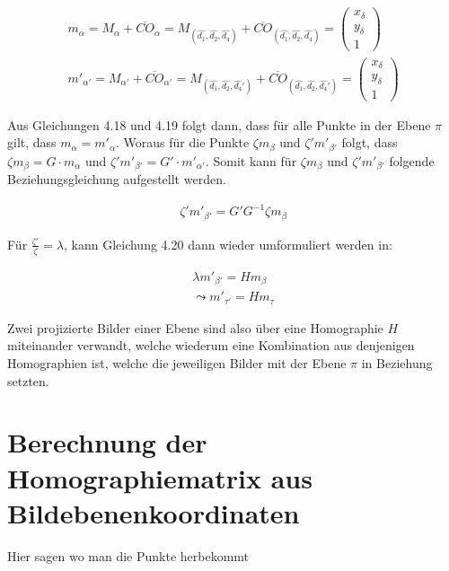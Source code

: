 \begin{gather}
	m_\alpha = M_\alpha + \overline{CO}_\alpha = M_{(\hat{d_1},\hat{d_2},\hat{d_4})} + \overline{CO}_{(\hat{d_1},\hat{d_2},\hat{d_4})} = \begin{pmatrix}
		x_\delta\\
		y_\delta\\
		1
	\end{pmatrix} \\
	m'_{\alpha'} = M_{\alpha'} + \overline{CO}_{\alpha'} = M_{(\hat{d_1},\hat{d_2},\hat{d_4}')} + \overline{CO}_{(\hat{d_1},\hat{d_2},\hat{d_4}')} = \begin{pmatrix}
	x_\delta\\
	y_\delta\\
	1
\end{pmatrix} 
\end{gather}

Aus Gleichungen 4.18 und 4.19 folgt dann, dass für alle Punkte in der Ebene $\pi$ gilt, dass $m_\alpha = m'_{\alpha}$. Woraus für die Punkte $\zeta m_\beta$ und $\zeta' m'_{\beta'}$ folgt, dass $\zeta m_\beta = G\cdot m_\alpha$ und $\zeta' m'_{\beta'} = G'\cdot m'_{\alpha'}$\cite{Elements}. Somit kann für $\zeta m_\beta$ und $\zeta' m'_{\beta'}$ folgende Beziehungsgleichung aufgestellt werden\cite{Elements}.

\begin{gather}
	\zeta' m'_{\beta'} = G' G^{-1} \zeta m_\beta
\end{gather}

Für $\frac{\zeta'}{\zeta} = \lambda$, kann Gleichung 4.20 dann wieder umformuliert werden in:

\begin{gather}
	\lambda m'_{\beta'} = H m_\beta\\
	\leadsto m'_{\tau'} = H m_\tau
\end{gather} 

Zwei projizierte Bilder einer Ebene sind also über eine Homographie $H$ miteinander verwandt, welche wiederum eine Kombination aus denjenigen Homographien ist, welche die jeweiligen Bilder mit der Ebene $\pi$ in Beziehung setzten\cite{Elements}.
 
\section{Berechnung der Homographiematrix aus Bildebenenkoordinaten}

Hier sagen wo man die Punkte herbekommt

